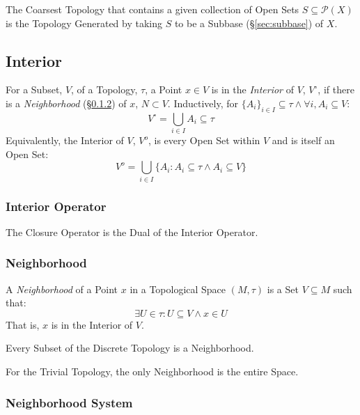 The Coarsest Topology that contains a given collection of Open Sets $S
\subseteq \mathcal{P}(X)$ is the Topology Generated by taking $S$ to
be a Subbase (\S\ref{sec:subbase}) of $X$.



\subsection{Interior}\label{sec:interior}

For a Subset, $V$, of a Topology, $\tau$, a Point $x \in V$ is in the
\emph{Interior} of $V$, $V^{\circ}$, if there is a \emph{Neighborhood}
(\S\ref{sec:neighborhood}) of $x$, $N \subset V$. Inductively, for
$\{A_i\}_{i \in I} \subseteq \tau \wedge \forall i, A_i \subseteq V$:
\[
  V^{\circ} = \bigcup_{i \in I} A_i \subseteq \tau
\]
Equivalently, the Interior of $V$, $V^o$, is every Open Set within $V$
and is itself an Open Set:
\[
  V^o = \bigcup_{i \in I} \{ A_i : A_i \subseteq \tau \wedge A_i
  \subseteq V \}
\]



\subsubsection{Interior Operator}\label{sec:interior_operator}

The Closure Operator is the Dual of the Interior Operator.



\subsubsection{Neighborhood}\label{sec:neighborhood}

A \emph{Neighborhood} of a Point $x$ in a Topological Space $(M,\tau)$
is a Set $V \subseteq M$ such that:
\[
  \exists U \in \tau : U \subseteq V \wedge x \in U
\]
That is, $x$ is in the Interior of $V$.

Every Subset of the Discrete Topology is a Neighborhood.

For the Trivial Topology, the only Neighborhood is the entire Space.



\subsubsection{Neighborhood System}\label{sec:neighborhood_system}

